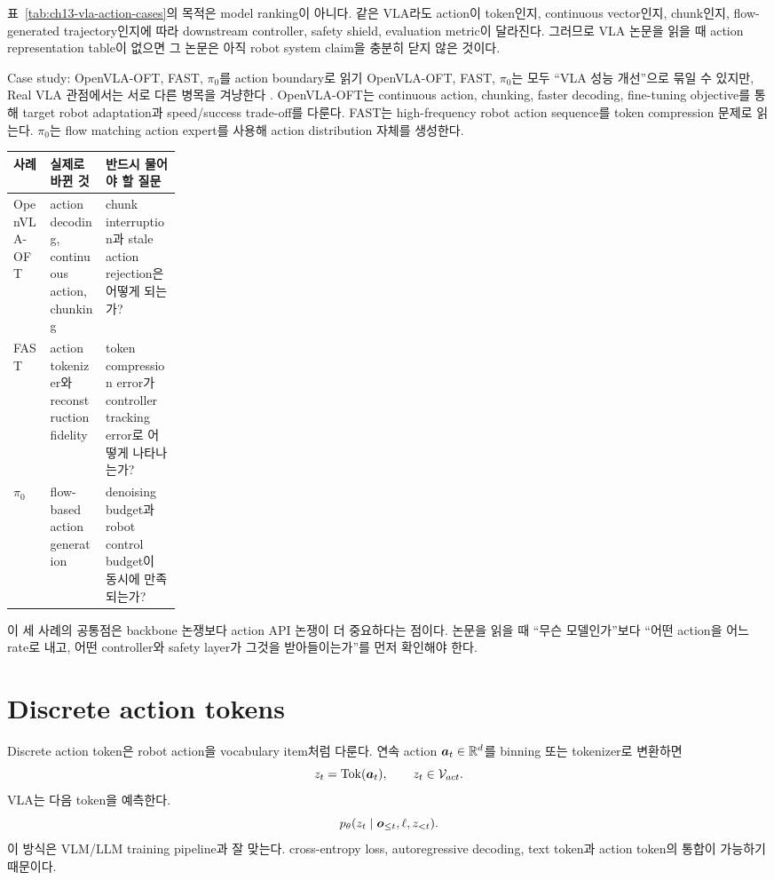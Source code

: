 표~\ref{tab:ch13-vla-action-cases}의 목적은 model ranking이 아니다. 같은 VLA라도 action이 token인지, continuous vector인지, chunk인지, flow-generated trajectory인지에 따라 downstream controller, safety shield, evaluation metric이 달라진다. 그러므로 VLA 논문을 읽을 때 action representation table이 없으면 그 논문은 아직 robot system claim을 충분히 닫지 않은 것이다.

\begin{casebox}{Case study: OpenVLA-OFT, FAST, $\pi_0$를 action boundary로 읽기}
OpenVLA-OFT, FAST, $\pi_0$는 모두 ``VLA 성능 개선''으로 묶일 수 있지만, Real VLA 관점에서는 서로 다른 병목을 겨냥한다 \cite{openvlaoft2025,fast2025,pi02024}. OpenVLA-OFT는 continuous action, chunking, faster decoding, fine-tuning objective를 통해 target robot adaptation과 speed/success trade-off를 다룬다. FAST는 high-frequency robot action sequence를 token compression 문제로 읽는다. $\pi_0$는 flow matching action expert를 사용해 action distribution 자체를 생성한다.

\begin{center}
\small
\begin{tabularx}{\linewidth}{@{}p{0.22\linewidth}X X@{}}
\toprule
사례 & 실제로 바뀐 것 & 반드시 물어야 할 질문 \\
\midrule
OpenVLA-OFT & action decoding, continuous action, chunking & chunk interruption과 stale action rejection은 어떻게 되는가? \\
FAST & action tokenizer와 reconstruction fidelity & token compression error가 controller tracking error로 어떻게 나타나는가? \\
$\pi_0$ & flow-based action generation & denoising budget과 robot control budget이 동시에 만족되는가? \\
\bottomrule
\end{tabularx}
\end{center}

이 세 사례의 공통점은 backbone 논쟁보다 action API 논쟁이 더 중요하다는 점이다. 논문을 읽을 때 ``무슨 모델인가''보다 ``어떤 action을 어느 rate로 내고, 어떤 controller와 safety layer가 그것을 받아들이는가''를 먼저 확인해야 한다.
\end{casebox}

\section{Discrete action tokens}

Discrete action token은 robot action을 vocabulary item처럼 다룬다. 연속 action $\bm{a}_t\in\mathbb{R}^d$를 binning 또는 tokenizer로 변환하면
\begin{equation}
  z_t
  =
  \mathrm{Tok}(\bm{a}_t),
  \qquad
  z_t\in\mathcal{V}_{act}.
  \label{eq:ch13-tokenizer}
\end{equation}
VLA는 다음 token을 예측한다.
\begin{equation}
  p_{\theta}(z_t \mid \bm{o}_{\leq t},\ell,z_{<t}).
  \label{eq:ch13-action-token-prob}
\end{equation}
이 방식은 VLM/LLM training pipeline과 잘 맞는다. cross-entropy loss, autoregressive decoding, text token과 action token의 통합이 가능하기 때문이다.

